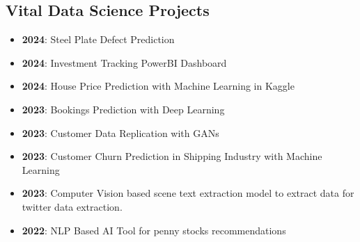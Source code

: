 \documentclass[pastel]{simplehipstercv}
\begin{document}
\begin{paracol}{2}
\section*{Vital Data Science Projects}
\vspace{1em}
\begin{itemize}
\small   
    \item \textbf{2024}: Steel Plate Defect Prediction
    \item \textbf{2024}: Investment Tracking PowerBI Dashboard 
    \item \textbf{2024}: House Price Prediction with Machine Learning in Kaggle
    \item \textbf{2023}: Bookings Prediction with Deep Learning
    \item \textbf{2023}: Customer Data Replication with GANs
    \item \textbf{2023}: Customer Churn Prediction in Shipping Industry with Machine Learning
    \item \textbf{2023}: Computer Vision based scene text extraction model to extract data for twitter data extraction.
    \item \textbf{2022}: NLP Based AI Tool for penny stocks recommendations

\end{itemize}


\end{paracol}
\end{document}
